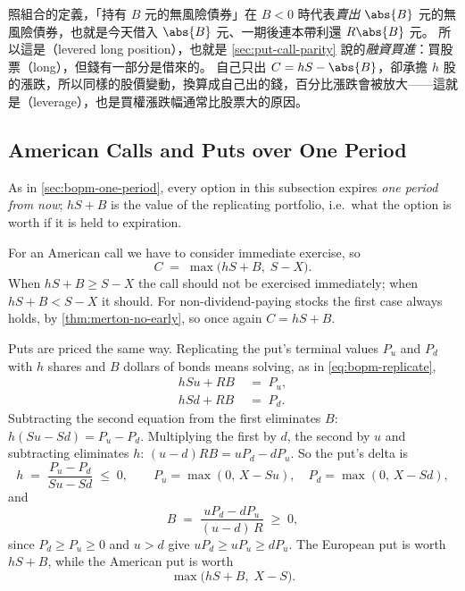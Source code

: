 \begin{remark}
	照組合的定義，「持有 $B$ 元的無風險債券」在 $B<0$ 時代表\emph{賣出} $\abs{B}$ 元的無風險債券，也就是今天借入 $\abs{B}$ 元、一期後連本帶利還 $R\abs{B}$ 元。
	所以這是（levered long position），也就是 \autoref{sec:put-call-parity} 說的\emph{融資買進}：買股票（long），但錢有一部分是借來的。
	自己只出 $C=hS-\abs{B}$，卻承擔 $h$ 股的漲跌，所以同樣的股價變動，換算成自己出的錢，百分比漲跌會被放大——這就是（leverage），也是買權漲跌幅通常比股票大的原因。
\end{remark}
	\suppend

\subsection{American Calls and Puts over One Period}
\label{sec:american-one-period}


\suppstart
As in \autoref{sec:bopm-one-period}, every option in this subsection expires \emph{one period from now}; $hS+B$ is the value of the replicating portfolio, i.e.\ what the option is worth if it is held to expiration.
\suppend

For an American call we have to consider immediate exercise, so
\[
	C \;=\; \max\bigl(hS+B,\; S-X\bigr) .
\]
When $hS+B\ge S-X$ the call should not be exercised immediately; when $hS+B<S-X$ it should.
For non-dividend-paying stocks the first case always holds, by \autoref{thm:merton-no-early}, so once again $C=hS+B$.

Puts are priced the same way.
\suppstart
Replicating the put's terminal values $P_{u}$ and $P_{d}$ with $h$ shares and $B$ dollars of bonds means solving, as in \eqref{eq:bopm-replicate},
\[
	\begin{aligned}
		hSu+RB & \;=\; P_{u} , \\
		hSd+RB & \;=\; P_{d} .
	\end{aligned}
\]
Subtracting the second equation from the first eliminates $B$: $h(Su-Sd)=P_{u}-P_{d}$.
Multiplying the first by $d$, the second by $u$ and subtracting eliminates $h$: $(u-d)RB=uP_{d}-dP_{u}$.
\suppend
So the put's delta is
\[
	h \;=\; \frac{P_{u}-P_{d}}{Su-Sd} \;\le\; 0 ,
	\qquad
	P_{u} = \max(0,\,X-Su) , \quad P_{d} = \max(0,\,X-Sd) ,
\]
and
\[
	B \;=\; \frac{uP_{d}-dP_{u}}{(u-d)\,R} \;\ge\; 0 ,
\]
\suppstart
since $P_{d}\ge P_{u}\ge 0$ and $u>d$ give $uP_{d}\ge uP_{u}\ge dP_{u}$.
\suppend
The European put is worth $hS+B$, while the American put is worth
\[
	\max\bigl(hS+B,\; X-S\bigr) .
\]

